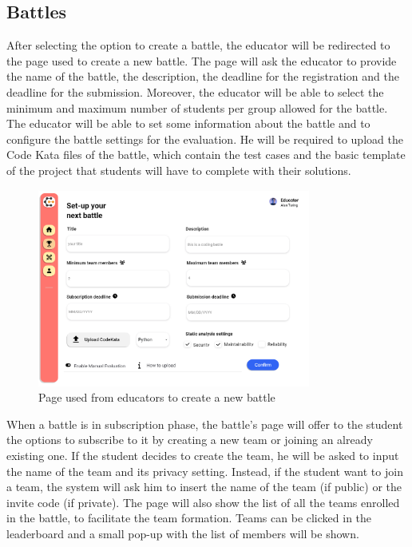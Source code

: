 \subsection{Battles}
After selecting the option to create a battle, the educator will be redirected to the page used to create a new battle. The page will ask the educator to provide the name of the battle, the description, the deadline for the registration and the deadline for the submission. Moreover, the educator will be able to select the minimum and maximum number of students per group allowed for the battle. The educator will be able to set some information about the battle and to configure the battle settings for the evaluation. He will be required to upload the Code Kata files of the battle, which contain the test cases and the basic template of the project that students will have to complete with their solutions.
\begin{figure}[H]
    \centering
    \includegraphics[width=0.8\textwidth]{Mockups/10_educator_create_battle.png}
    \caption{Page used from educators to create a new battle}
\end{figure}
When a battle is in subscription phase, the battle's page will offer to the student the options to subscribe to it by creating a new team or joining an already existing one. If the student decides to create the team, he will be asked to input the name of the team and its privacy setting. Instead, if the student want to join a team, the system will ask him to insert the name of the team (if public) or the invite code (if private). The page will also show the list of all the teams enrolled in the battle, to facilitate the team formation. Teams can be clicked in the leaderboard and a small pop-up with the list of members will be shown.\\
